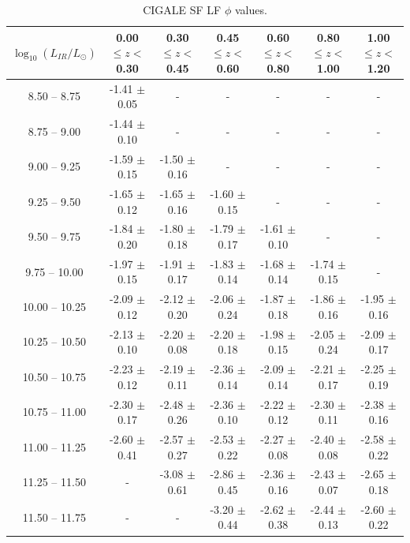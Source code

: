 \begin{landscape}
    \begin{table}
    \begin{center}
    \caption{CIGALE SF LF $\phi$ values.}
    \label{Tab: CG SF LF}
    \begin{tabular}{@{}ccccccc@{}}
        \toprule
        $\log_{10}(L_{IR}/L_{\odot})$ & 0.00 $\leq z <$ 0.30 & 0.30 $\leq z <$ 0.45 & 0.45 $\leq z <$ 0.60 & 0.60 $\leq z <$ 0.80 & 0.80 $\leq z <$ 1.00 & 1.00 $\leq z <$ 1.20 \\
        \hline
         8.50 --  8.75 & -1.41 $\pm$ 0.05 & - & - & - & - & - \\
         8.75 --  9.00 & -1.44 $\pm$ 0.10 & - & - & - & - & - \\
         9.00 --  9.25 & -1.59 $\pm$ 0.15 & -1.50 $\pm$ 0.16 & - & - & - & - \\
         9.25 --  9.50 & -1.65 $\pm$ 0.12 & -1.65 $\pm$ 0.16 & -1.60 $\pm$ 0.15 & - & - & - \\
         9.50 --  9.75 & -1.84 $\pm$ 0.20 & -1.80 $\pm$ 0.18 & -1.79 $\pm$ 0.17 & -1.61 $\pm$ 0.10 & - & - \\
         9.75 -- 10.00 & -1.97 $\pm$ 0.15 & -1.91 $\pm$ 0.17 & -1.83 $\pm$ 0.14 & -1.68 $\pm$ 0.14 & -1.74 $\pm$ 0.15 & - \\
        10.00 -- 10.25 & -2.09 $\pm$ 0.12 & -2.12 $\pm$ 0.20 & -2.06 $\pm$ 0.24 & -1.87 $\pm$ 0.18 & -1.86 $\pm$ 0.16 & -1.95 $\pm$ 0.16 \\
        10.25 -- 10.50 & -2.13 $\pm$ 0.10 & -2.20 $\pm$ 0.08 & -2.20 $\pm$ 0.18 & -1.98 $\pm$ 0.15 & -2.05 $\pm$ 0.24 & -2.09 $\pm$ 0.17 \\
        10.50 -- 10.75 & -2.23 $\pm$ 0.12 & -2.19 $\pm$ 0.11 & -2.36 $\pm$ 0.14 & -2.09 $\pm$ 0.14 & -2.21 $\pm$ 0.17 & -2.25 $\pm$ 0.19 \\
        10.75 -- 11.00 & -2.30 $\pm$ 0.17 & -2.48 $\pm$ 0.26 & -2.36 $\pm$ 0.10 & -2.22 $\pm$ 0.12 & -2.30 $\pm$ 0.11 & -2.38 $\pm$ 0.16 \\
        11.00 -- 11.25 & -2.60 $\pm$ 0.41 & -2.57 $\pm$ 0.27 & -2.53 $\pm$ 0.22 & -2.27 $\pm$ 0.08 & -2.40 $\pm$ 0.08 & -2.58 $\pm$ 0.22 \\
        11.25 -- 11.50 & -                & -3.08 $\pm$ 0.61 & -2.86 $\pm$ 0.45 & -2.36 $\pm$ 0.16 & -2.43 $\pm$ 0.07 & -2.65 $\pm$ 0.18 \\
        11.50 -- 11.75 & -                & -                & -3.20 $\pm$ 0.44 & -2.62 $\pm$ 0.38 & -2.44 $\pm$ 0.13 & -2.60 $\pm$ 0.22 \\

\end{tabular}
\end{center}
\end{table}
\end{landscape}
